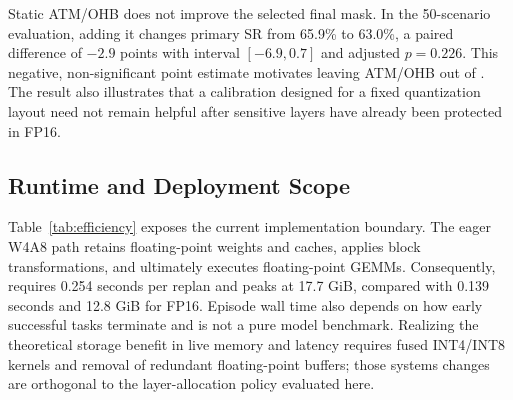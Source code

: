 Static ATM/OHB does not improve the selected final mask. In the 50-scenario evaluation, adding it changes primary SR from 65.9\% to 63.0\%, a paired difference of $-2.9$ points with interval $[-6.9,0.7]$ and adjusted $p=0.226$. This negative, non-significant point estimate motivates leaving ATM/OHB out of \method. The result also illustrates that a calibration designed for a fixed quantization layout need not remain helpful after sensitive layers have already been protected in FP16.

\subsection{Runtime and Deployment Scope}
\label{sec:runtime}



Table~\ref{tab:efficiency} exposes the current implementation boundary. The eager W4A8 path retains floating-point weights and caches, applies block transformations, and ultimately executes floating-point GEMMs. Consequently, \method requires 0.254 seconds per replan and peaks at 17.7 GiB, compared with 0.139 seconds and 12.8 GiB for FP16. Episode wall time also depends on how early successful tasks terminate and is not a pure model benchmark. Realizing the theoretical storage benefit in live memory and latency requires fused INT4/INT8 kernels and removal of redundant floating-point buffers; those systems changes are orthogonal to the layer-allocation policy evaluated here.
